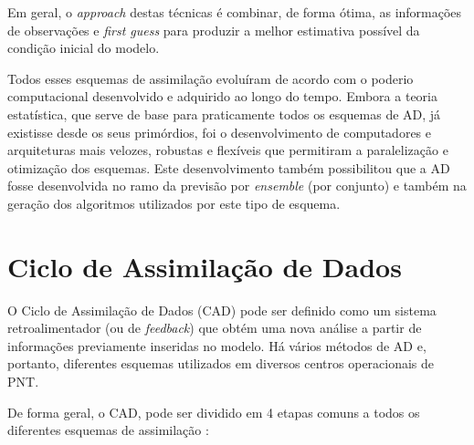 Em geral, o \textit{approach} destas técnicas é combinar, de forma ótima, as informações de observações e \textit{first guess} para produzir a melhor estimativa possível da condição inicial do modelo.

Todos esses esquemas de assimilação evoluíram de acordo com o poderio computacional desenvolvido e adquirido ao longo do tempo. Embora a teoria estatística, que serve de base para praticamente todos os esquemas de AD, já existisse desde os seus primórdios, foi o desenvolvimento de computadores e arquiteturas mais velozes, robustas e flexíveis que permitiram a paralelização e otimização dos esquemas. Este desenvolvimento também possibilitou que a AD fosse desenvolvida no ramo da previsão por \textit{ensemble} (por conjunto) e também na geração dos algoritmos utilizados por este tipo de esquema.

\section{Ciclo de Assimilação de Dados}
\label{ss:cicloassimdados}

O Ciclo de Assimilação de Dados (CAD) pode ser definido como um sistema retroalimentador (ou de \textit{feedback}) que obtém uma nova análise a partir de informações previamente inseridas no modelo. Há vários métodos de AD e, portanto, diferentes esquemas utilizados em diversos centros operacionais de PNT.

De forma geral, o CAD, pode ser dividido em 4 etapas comuns a todos os diferentes esquemas de assimilação \cite{nowosad2001}:

